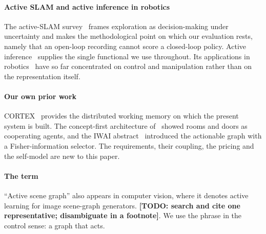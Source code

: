 \documentclass[10pt,twocolumn]{IEEEtran}
\newcommand{\todo}[1]{{\color{red}\textbf{[TODO: #1]}}}
\begin{document}
\paragraph{Active SLAM and active inference in robotics} The active-SLAM
survey~\cite{placedSurveyActiveSimultaneous2023} frames exploration as decision-making under
uncertainty and makes the methodological point on which our evaluation rests, namely that an open-loop
recording cannot score a closed-loop policy. Active inference~\cite{friston2010free,friston2015epistemic}
supplies the single functional we use throughout. Its applications in
robotics~\cite{lanillosActiveInferenceRobotics2021,pezzatoMobileManipulationActive2025} have so far
concentrated on control and manipulation rather than on the representation itself.

\paragraph{Our own prior work} CORTEX~\cite{bustos_cortex_2019,proposal-latency-bustos} provides the
distributed working memory on which the present system is built. The concept-first architecture
of~\cite{zapatacornejoConceptGuidedExplorationBuilding2025} showed rooms and doors as cooperating
agents, and the IWAI abstract~\cite{bustos2026active} introduced the actionable graph with a
Fisher-information selector. The requirements, their coupling, the pricing and the self-model are new
to this paper.

\paragraph{The term} ``Active scene graph'' also appears in computer vision, where it denotes active
learning for image scene-graph generators. \todo{search and cite one representative; disambiguate in
a footnote}. We use the phrase in the control sense: a graph that acts.
\end{document}
